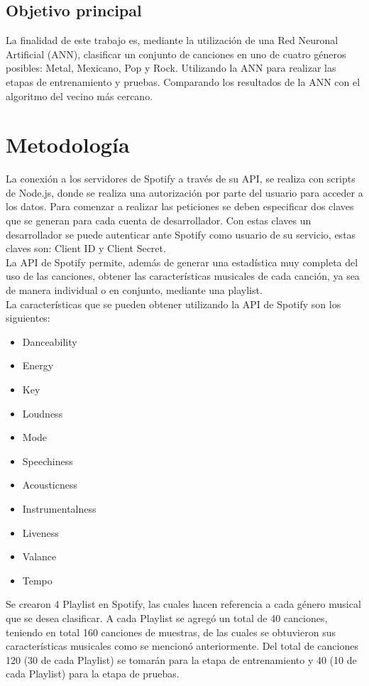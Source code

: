 \documentclass[conference]{IEEEtran}
\begin{document}
\subsection{Objetivo principal}
La finalidad de este trabajo es, mediante la utilización de una Red Neuronal Artificial (ANN), clasificar un conjunto de canciones en uno de cuatro géneros posibles: Metal, Mexicano, Pop y Rock. Utilizando la ANN para realizar las etapas de entrenamiento y pruebas. Comparando los resultados de la ANN con el algoritmo del vecino más cercano.\\

\section{Metodolog\'ia}
La conexión a los servidores de Spotify a través de su API, se realiza con scripts de Node.js, donde se realiza una autorización por parte del usuario para acceder a los datos. Para comenzar a realizar las peticiones se deben especificar dos claves que se generan para cada cuenta de desarrollador. Con estas claves un desarrollador se puede autenticar ante Spotify como usuario de su servicio, estas claves son: Client ID y Client Secret.\\

La API de Spotify permite, además de generar una estadística muy completa del uso de las canciones, obtener las características musicales de cada canción, ya sea de manera individual o en conjunto, mediante una playlist.\\
La características que se pueden obtener utilizando la API de Spotify son los siguientes: \\

\begin{itemize}
	\item Danceability
	\item Energy
	\item Key
	\item Loudness
	\item Mode
	\item Speechiness
	\item Acousticness
	\item Instrumentalness
	\item Liveness
	\item Valance
	\item Tempo \\
\end{itemize}

Se crearon 4 Playlist en Spotify, las cuales hacen referencia a cada género musical que se desea clasificar. A cada Playlist se agregó un total de 40 canciones, teniendo en total 160 canciones de muestras, de las cuales se obtuvieron sus características musicales como se mencionó anteriormente. Del total de canciones 120 (30 de cada Playlist) se tomarán para la etapa de entrenamiento y 40 (10 de cada Playlist) para la etapa de pruebas.\\
\end{document}
